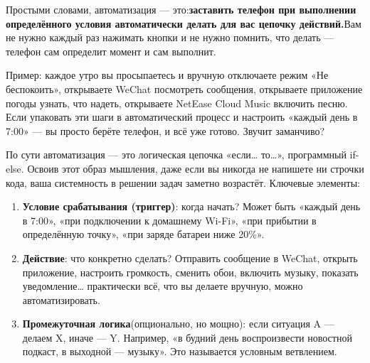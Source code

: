 


Простыми словами, автоматизация — это:\textbf{заставить телефон при выполнении определённого условия автоматически делать для вас цепочку действий.}Вам не нужно каждый раз нажимать кнопки и не нужно помнить, что делать — телефон сам определит момент и сам выполнит.

Пример: каждое утро вы просыпаетесь и вручную отключаете режим «Не беспокоить», открываете WeChat посмотреть сообщения, открываете приложение погоды узнать, что надеть, открываете NetEase Cloud Music включить песню. Если упаковать эти шаги в автоматический процесс и настроить «каждый день в 7:00» — вы просто берёте телефон, и всё уже готово. Звучит заманчиво?

По сути автоматизация — это логическая цепочка «если… то…», программный if-else. Освоив этот образ мышления, даже если вы никогда не напишете ни строчки кода, ваша системность в решении задач заметно возрастёт. Ключевые элементы:

\begin{enumerate}
  \item \textbf{Условие срабатывания (триггер)}: когда начать? Может быть «каждый день в 7:00», «при подключении к домашнему Wi-Fi», «при прибытии в определённую точку», «при заряде батареи ниже 20\%».
  \item \textbf{Действие}: что конкретно сделать? Отправить сообщение в WeChat, открыть приложение, настроить громкость, сменить обои, включить музыку, показать уведомление… практически всё, что вы делаете вручную, можно автоматизировать.
  \item \textbf{Промежуточная логика}(опционально, но мощно): если ситуация A — делаем X, иначе — Y. Например, «в будний день воспроизвести новостной подкаст, в выходной — музыку». Это называется условным ветвлением.
\end{enumerate}

